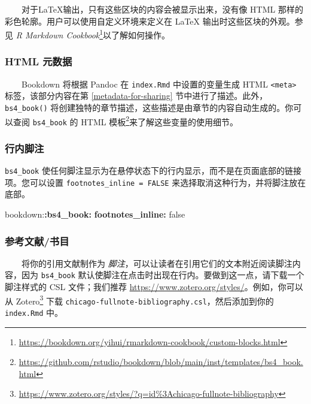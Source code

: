 \documentclass[
  12pt,
]{krantz}
\newenvironment{Shaded}{\begin{snugshade}}{\end{snugshade}}
\newcommand{\AttributeTok}[1]{\textcolor[rgb]{0.13,0.29,0.53}{#1}}
\newcommand{\CharTok}[1]{\textcolor[rgb]{0.31,0.60,0.02}{#1}}
\newcommand{\FunctionTok}[1]{\textcolor[rgb]{0.13,0.29,0.53}{\textbf{#1}}}
\newcommand{\KeywordTok}[1]{\textcolor[rgb]{0.13,0.29,0.53}{\textbf{#1}}}
\renewcommand{\href}[2]{#2\footnote{\url{#1}}}
\theoremstyle{definition}
\theoremstyle{definition}
\theoremstyle{definition}
\theoremstyle{definition}
\theoremstyle{remark}
\begin{document}
  对于LaTeX输出，只有这些区块的内容会被显示出来，没有像 HTML 那样的彩色轮廓。用户可以使用自定义环境来定义在 LaTeX 输出时这些区块的外观。参见 \href{https://bookdown.org/yihui/rmarkdown-cookbook/custom-blocks.html}{\emph{R Markdown Cookbook}}以了解如何操作。

\hypertarget{html-ux5143ux6570ux636e}{%
\subsubsection{HTML 元数据}\label{html-ux5143ux6570ux636e}}

  Bookdown 将根据 Pandoc 在 \texttt{index.Rmd} 中设置的变量生成 HTML \texttt{\textless{}meta\textgreater{}} 标签，该部分内容在第 \ref{metadata-for-sharing} 节中进行了描述。此外，\texttt{bs4\_book()} 将创建独特的章节描述，这些描述是由章节的内容自动生成的。你可以查阅 \href{https://github.com/rstudio/bookdown/blob/main/inst/templates/bs4_book.html}{\texttt{bs4\_book} 的 HTML
模板}来了解这些变量的使用细节。

\hypertarget{bs4-book-footnotes}{%
\subsubsection{行内脚注}\label{bs4-book-footnotes}}

\texttt{bs4\_book} 使任何脚注显示为在悬停状态下的行内显示，而不是在页面底部的链接项。您可以设置 \texttt{footnotes\_inline\ =\ FALSE} 来选择取消这种行为，并将脚注放在底部。

\begin{Shaded}
\begin{Highlighting}[]
\AttributeTok{bookdown:}\FunctionTok{:bs4\_book}\KeywordTok{:}
\AttributeTok{  }\FunctionTok{footnotes\_inline}\KeywordTok{:}\AttributeTok{ }\CharTok{false}
\end{Highlighting}
\end{Shaded}

\hypertarget{ux53c2ux8003ux6587ux732eux4e66ux76ee}{%
\subsubsection{参考文献/书目}\label{ux53c2ux8003ux6587ux732eux4e66ux76ee}}

  将你的引用文献制作为 \emph{脚注}，可以让读者在引用它们的文本附近阅读脚注内容，因为 \texttt{bs4\_book} 默认使脚注在点击时出现在行内。要做到这一点，请下载一个脚注样式的 CSL 文件；我们推荐 \url{https://www.zotero.org/styles/}。例如，你可以从 \href{https://www.zotero.org/styles/?q=id\%3Achicago-fullnote-bibliography}{Zotero} 下载 \texttt{chicago-fullnote-bibliography.csl}，然后添加到你的 \texttt{index.Rmd} 中。
\end{document}
